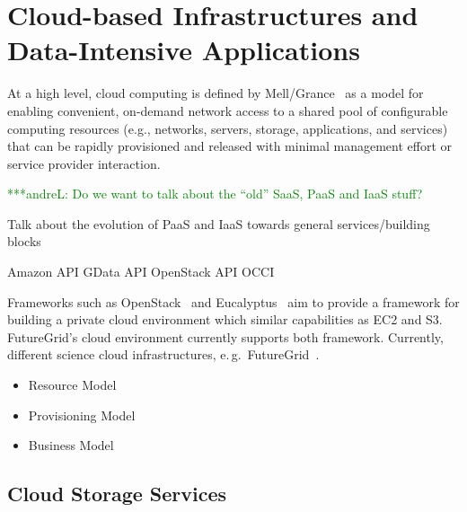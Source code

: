 \documentclass[times]{cpeauth}
\newcommand{\alnote}[1]{ {\textcolor{green} { ***andreL: #1 }}}
\newcommand{\alnote}[1]{}
\begin{document}
\section{Cloud-based Infrastructures and Data-Intensive Applications}

At a high level, cloud computing is defined by Mell/Grance~\cite{nist_cloud}
as a model for enabling convenient, on-demand network access to a shared pool
of configurable computing resources (e.g., networks, servers, storage,
applications, and services) that can be rapidly provisioned and released with
minimal management effort or service provider interaction.

\alnote{Do we want to talk about the ``old'' SaaS, PaaS and IaaS stuff?}

Talk about the evolution of PaaS and IaaS towards general services/building 
blocks

Amazon API
GData API
OpenStack API
OCCI


Frameworks such as OpenStack~\cite{openstack} and Eucalyptus~\cite{euca} aim
to provide a framework for building a private cloud environment which similar
capabilities as EC2 and S3. FutureGrid's cloud environment currently supports
both framework. Currently, different science cloud infrastructures, e.\,g.\ 
FutureGrid~\cite{futuregrid}.

\begin{itemize}
	\item Resource Model
	\item Provisioning Model
	\item Business Model
\end{itemize}

\subsection{Cloud Storage Services}
\end{document}
